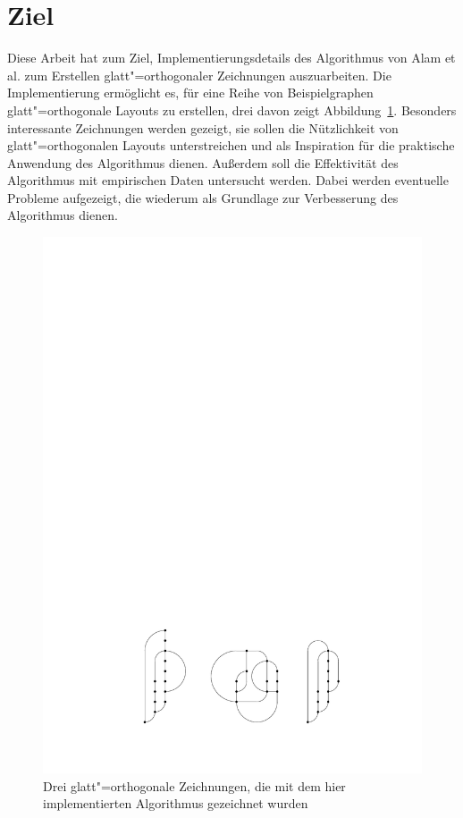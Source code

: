 \documentclass[a4paper]{scrreprt}
\theoremstyle{definition}
\begin{document}
\section{Ziel}

Diese Arbeit hat zum Ziel, Implementierungsdetails des Algorithmus von Alam et al. zum Erstellen glatt"=orthogonaler Zeichnungen auszuarbeiten. Die Implementierung ermöglicht es, für eine Reihe von Beispielgraphen glatt"=orthogonale Layouts zu erstellen, drei davon zeigt Abbildung~\ref{fig:introDemoGraphs}. Besonders interessante Zeichnungen werden gezeigt, sie sollen die Nützlichkeit von glatt"=orthogonalen Layouts unterstreichen und als Inspiration für die praktische Anwendung des Algorithmus dienen. Außerdem soll die Effektivität des Algorithmus mit empirischen Daten untersucht werden. Dabei werden eventuelle Probleme aufgezeigt, die wiederum als Grundlage zur Verbesserung des Algorithmus dienen. 

\begin{figure}[h]
  \centering
  \includegraphics{intro_graphs}
  \caption{Drei glatt"=orthogonale Zeichnungen, die mit dem hier implementierten Algorithmus gezeichnet wurden}
  \label{fig:introDemoGraphs}
\end{figure}
\end{document}
